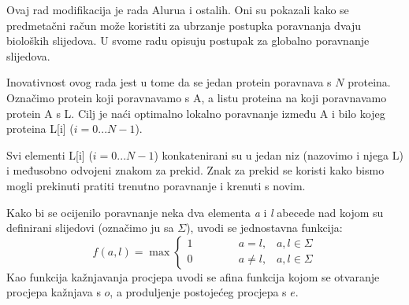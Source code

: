 \documentclass[times, utf8, zavrsni, numeric]{fer}
\begin{document}
Ovaj rad modifikacija je rada Alurua i ostalih\cite{aluru}. Oni su pokazali kako se predmetačni račun može koristiti za ubrzanje postupka poravnanja dvaju bioloških slijedova. U svome radu opisuju postupak za globalno poravnanje slijedova.

Inovativnost ovog rada jest u tome da se jedan protein poravnava s $N$ proteina. Označimo protein koji poravnavamo s A, a listu proteina na koji poravnavamo protein A s L. Cilj je naći optimalno lokalno poravnanje između A i bilo kojeg proteina L[i] ($i = 0...N-1$).

Svi elementi L[i] ($i = 0...N-1$) konkatenirani su u jedan niz (nazovimo i njega L) i međusobno odvojeni znakom za prekid. Znak za prekid se koristi kako bismo mogli prekinuti pratiti trenutno poravnanje i krenuti s novim.

Kako bi se ocijenilo poravnanje neka dva elementa \emph{a} i \emph{l} abecede nad kojom su definirani slijedovi (označimo ju sa $\Sigma$), uvodi se jednostavna funkcija:
\begin{equation}
f(a, l) = \max \left\{
	\begin{array}{lr}
		1\hspace{50pt}a = l,\hspace{10pt}a,l \in \Sigma \\
		0\hspace{50pt}a \ne l,\hspace{10pt}a, l \in \Sigma
	\end{array}
\right.
\end{equation}
Kao funkcija kažnjavanja procjepa uvodi se afina funkcija kojom se otvaranje procjepa kažnjava s $o$, a produljenje postojećeg procjepa s $e$.
\end{document}
